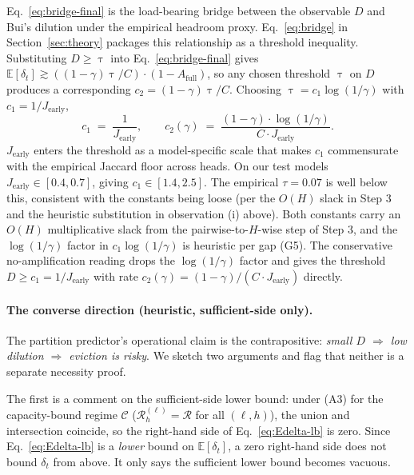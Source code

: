 Eq.~\eqref{eq:bridge-final} is the load-bearing bridge between the
observable $D$ and Bui's dilution under the empirical headroom proxy.
Eq.~\eqref{eq:bridge} in Section~\ref{sec:theory} packages this
relationship as a threshold inequality. Substituting $D \geq \uptau$
into Eq.~\eqref{eq:bridge-final} gives $\mathbb{E}[\delta_t] \gtrsim
((1 - \gamma) \uptau / C) \cdot (1 - A_{\mathrm{full}})$, so any
chosen threshold $\uptau$ on $D$ produces a corresponding
$c_2 = (1 - \gamma) \uptau / C$. Choosing
$\uptau = c_1 \log(1/\gamma)$ with $c_1 = 1/J_{\text{early}}$,
\begin{equation}
\label{eq:c1c2}
\boxed{
c_1 \;=\; \frac{1}{J_{\text{early}}}, \qquad
c_2(\gamma) \;=\; \frac{(1 - \gamma) \cdot \log(1/\gamma)}{C \cdot J_{\text{early}}}.
}
\end{equation}
$J_{\text{early}}$ enters the threshold as a model-specific scale that
makes $c_1$ commensurate with the empirical Jaccard floor across heads.
On our test models $J_{\text{early}} \in [0.4, 0.7]$, giving $c_1 \in
[1.4, 2.5]$. The empirical $\tau = 0.07$ is well below this, consistent
with the constants being loose (per the $O(H)$ slack in Step 3 and the
heuristic substitution in observation (i) above). Both constants carry
an $O(H)$ multiplicative slack from the pairwise-to-$H$-wise step of
Step 3, and the $\log(1/\gamma)$ factor in $c_1 \log(1/\gamma)$ is
heuristic per gap (G5). The conservative no-amplification reading drops
the $\log(1/\gamma)$ factor and gives the threshold $D \geq c_1 =
1/J_{\text{early}}$ with rate $c_2(\gamma) = (1 - \gamma)/(C \cdot
J_{\text{early}})$ directly.

\paragraph{The converse direction (heuristic, sufficient-side only).}
The partition predictor's operational claim is the contrapositive:
\emph{small $D$ $\Rightarrow$ low dilution $\Rightarrow$ eviction is
risky}. We sketch two arguments and flag that neither is a separate
necessity proof.

The first is a comment on the sufficient-side lower bound: under (A3)
for the capacity-bound regime $\mathcal{C}$ ($\mathcal{R}^{(\ell)}_h =
\mathcal{R}$ for all $(\ell, h)$), the union and intersection coincide,
so the right-hand side of Eq.~\eqref{eq:Edelta-lb} is zero. Since
Eq.~\eqref{eq:Edelta-lb} is a \emph{lower} bound on
$\mathbb{E}[\delta_t]$, a zero right-hand side does not bound
$\delta_t$ from above. It only says the sufficient lower bound becomes
vacuous.

